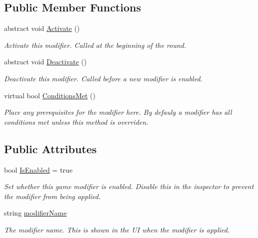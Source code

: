 \subsection*{Public Member Functions}
\begin{DoxyCompactItemize}
\item 
abstract void \hyperlink{class_multi_stack_1_1_game_modifier_a3fb880f9728f8680bf473ac5c7f6832e}{Activate} ()
\begin{DoxyCompactList}\small\item\em Activate this modifier. Called at the beginning of the round. \end{DoxyCompactList}\item 
abstract void \hyperlink{class_multi_stack_1_1_game_modifier_abe04db6ab31f5e5063739d8e5a3f7ad1}{Deactivate} ()
\begin{DoxyCompactList}\small\item\em Deactivate this modifier. Called before a new modifier is enabled. \end{DoxyCompactList}\item 
virtual bool \hyperlink{class_multi_stack_1_1_game_modifier_acbf45f289c8da7d9aaf129573b2c807c}{Conditions\+Met} ()
\begin{DoxyCompactList}\small\item\em Place any prerequisites for the modifier here. By defauly a modifier has all conditions met unless this method is overriden. \end{DoxyCompactList}\end{DoxyCompactItemize}
\subsection*{Public Attributes}
\begin{DoxyCompactItemize}
\item 
bool \hyperlink{class_multi_stack_1_1_game_modifier_a307c902c8fb9fac72d7a4dd74a6bf050}{Is\+Enabled} = true
\begin{DoxyCompactList}\small\item\em Set whether this game modifier is enabled. Disable this in the inspector to prevent the modifier from being applied. \end{DoxyCompactList}\item 
string \hyperlink{class_multi_stack_1_1_game_modifier_ad998250afe8d90cd438b4777a86e34bb}{modifier\+Name}
\begin{DoxyCompactList}\small\item\em The modifier name. This is shown in the U\+I when the modifier is applied. \end{DoxyCompactList}\end{DoxyCompactItemize}


